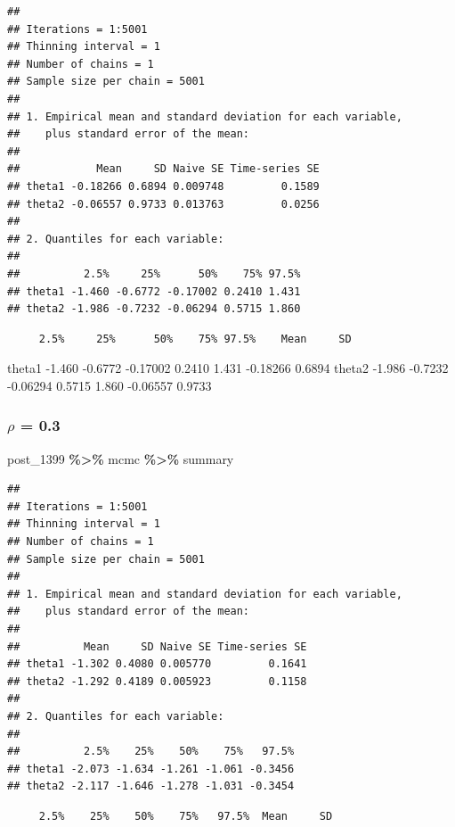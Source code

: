 \documentclass[
]{article}
\newenvironment{Shaded}{\begin{snugshade}}{\end{snugshade}}
\newcommand{\NormalTok}[1]{#1}
\newcommand{\SpecialCharTok}[1]{\textcolor[rgb]{0.81,0.36,0.00}{\textbf{#1}}}
\begin{document}
\begin{verbatim}
## 
## Iterations = 1:5001
## Thinning interval = 1 
## Number of chains = 1 
## Sample size per chain = 5001 
## 
## 1. Empirical mean and standard deviation for each variable,
##    plus standard error of the mean:
## 
##            Mean     SD Naive SE Time-series SE
## theta1 -0.18266 0.6894 0.009748         0.1589
## theta2 -0.06557 0.9733 0.013763         0.0256
## 
## 2. Quantiles for each variable:
## 
##          2.5%     25%      50%    75% 97.5%
## theta1 -1.460 -0.6772 -0.17002 0.2410 1.431
## theta2 -1.986 -0.7232 -0.06294 0.5715 1.860
\end{verbatim}

\begin{verbatim}
     2.5%     25%      50%    75% 97.5%    Mean     SD
\end{verbatim}

theta1 -1.460 -0.6772 -0.17002 0.2410 1.431 -0.18266 0.6894 theta2
-1.986 -0.7232 -0.06294 0.5715 1.860 -0.06557 0.9733

\subsubsection{\texorpdfstring{\(\rho\) =
0.3}{\textbackslash rho = 0.3}}\label{rho-0.3-3}

\begin{Shaded}
\begin{Highlighting}[]
\NormalTok{post\_1399 }\SpecialCharTok{\%\textgreater{}\%}\NormalTok{ mcmc }\SpecialCharTok{\%\textgreater{}\%}\NormalTok{ summary}
\end{Highlighting}
\end{Shaded}

\begin{verbatim}
## 
## Iterations = 1:5001
## Thinning interval = 1 
## Number of chains = 1 
## Sample size per chain = 5001 
## 
## 1. Empirical mean and standard deviation for each variable,
##    plus standard error of the mean:
## 
##          Mean     SD Naive SE Time-series SE
## theta1 -1.302 0.4080 0.005770         0.1641
## theta2 -1.292 0.4189 0.005923         0.1158
## 
## 2. Quantiles for each variable:
## 
##          2.5%    25%    50%    75%   97.5%
## theta1 -2.073 -1.634 -1.261 -1.061 -0.3456
## theta2 -2.117 -1.646 -1.278 -1.031 -0.3454
\end{verbatim}

\begin{verbatim}
     2.5%    25%    50%    75%   97.5%  Mean     SD
\end{verbatim}
\end{document}
